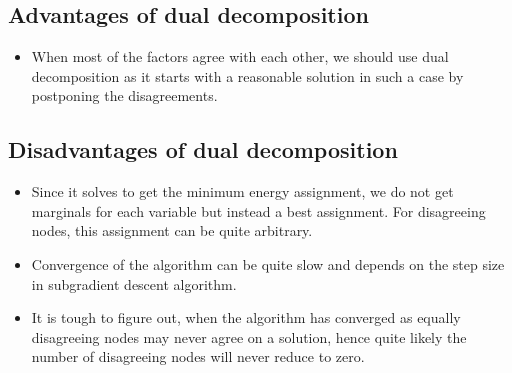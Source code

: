 \documentclass[10pt,oneside,letterpaper]{article}
\begin{document}
\subsection{Advantages of dual decomposition}
\begin{itemize}
  \item When most of the factors agree with each other, we should use dual decomposition as it starts with a reasonable solution in such a case by postponing the disagreements.
\end{itemize}
\subsection{Disadvantages of dual decomposition}
\begin{itemize}
  \item Since it solves to get the minimum energy assignment, we do not get marginals for each variable but instead a best assignment. For disagreeing nodes, this assignment can be quite arbitrary.
  \item Convergence of the algorithm can be quite slow and depends on the step size in subgradient descent algorithm.
  \item It is tough to figure out, when the algorithm has converged as equally disagreeing nodes may never agree on a solution, hence quite likely the number of disagreeing nodes will never reduce to zero.
\end{itemize}
\end{document}

